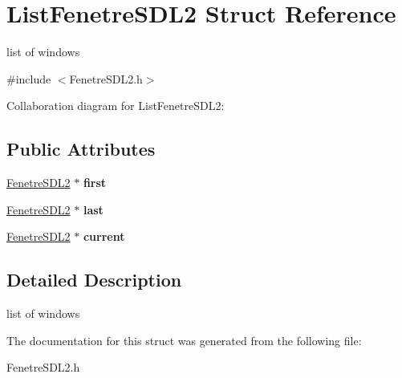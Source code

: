 \hypertarget{structListFenetreSDL2}{}\section{List\+Fenetre\+S\+D\+L2 Struct Reference}
\label{structListFenetreSDL2}


list of windows  




{\ttfamily \#include $<$Fenetre\+S\+D\+L2.\+h$>$}



Collaboration diagram for List\+Fenetre\+S\+D\+L2\+:
\subsection*{Public Attributes}
\begin{DoxyCompactItemize}
\item 
\hyperlink{structFenetreSDL2}{Fenetre\+S\+D\+L2} $\ast$ {\bfseries first}\hypertarget{structListFenetreSDL2_a3e98a4f91573e5dd33642faf081eec53}{}\label{structListFenetreSDL2_a3e98a4f91573e5dd33642faf081eec53}

\item 
\hyperlink{structFenetreSDL2}{Fenetre\+S\+D\+L2} $\ast$ {\bfseries last}\hypertarget{structListFenetreSDL2_ab5792864d3b0449f51f7ccc33941b6eb}{}\label{structListFenetreSDL2_ab5792864d3b0449f51f7ccc33941b6eb}

\item 
\hyperlink{structFenetreSDL2}{Fenetre\+S\+D\+L2} $\ast$ {\bfseries current}\hypertarget{structListFenetreSDL2_a3a7fea2f3274fbf1de33b4a986aee120}{}\label{structListFenetreSDL2_a3a7fea2f3274fbf1de33b4a986aee120}

\end{DoxyCompactItemize}


\subsection{Detailed Description}
list of windows 

The documentation for this struct was generated from the following file\+:\begin{DoxyCompactItemize}
\item 
Fenetre\+S\+D\+L2.\+h\end{DoxyCompactItemize}
